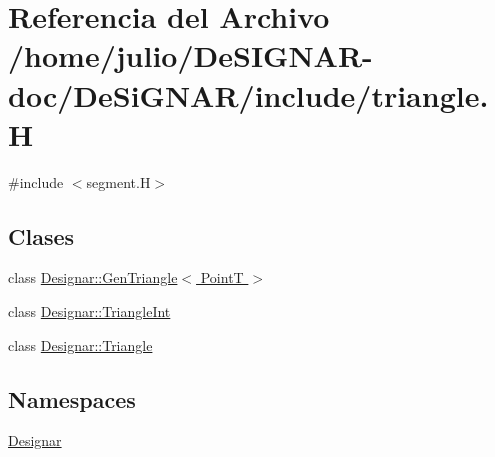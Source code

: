 \hypertarget{triangle_8_h}{}\section{Referencia del Archivo /home/julio/\+De\+S\+I\+G\+N\+A\+R-\/doc/\+De\+Si\+G\+N\+A\+R/include/triangle.H}
\label{triangle_8_h}
{\ttfamily \#include $<$segment.\+H$>$}\newline
\subsection*{Clases}
\begin{DoxyCompactItemize}
\item 
class \hyperlink{class_designar_1_1_gen_triangle}{Designar\+::\+Gen\+Triangle$<$ Point\+T $>$}
\item 
class \hyperlink{class_designar_1_1_triangle_int}{Designar\+::\+Triangle\+Int}
\item 
class \hyperlink{class_designar_1_1_triangle}{Designar\+::\+Triangle}
\end{DoxyCompactItemize}
\subsection*{Namespaces}
\begin{DoxyCompactItemize}
\item 
 \hyperlink{namespace_designar}{Designar}
\end{DoxyCompactItemize}
